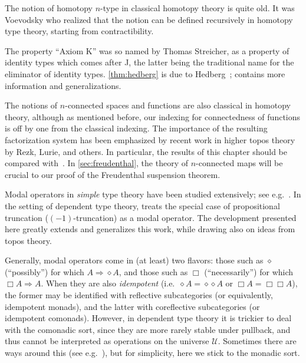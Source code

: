 \documentclass[12pt]{article}
\newcommand{\UU}{\ensuremath{\mathcal{U}}\xspace}
\let\autoref\cref
\begin{document}
The notion of homotopy $n$-type in classical homotopy theory is quite old.
It was Voevodsky who realized that the notion can be defined recursively in homotopy type theory, starting from contractibility.

%
The property ``Axiom K'' was so named by Thomas Streicher, as a property of identity types which comes after J, the latter being the traditional name for the eliminator of identity types.
\autoref{thm:hedberg} is due to Hedberg~\cite{hedberg1998coherence}; \cite{krausgeneralizations} contains more information and generalizations.

The notions of $n$-connected spaces and functions are also classical in homotopy theory, although as mentioned before, our indexing for connectedness of functions is off by one from the classical indexing.
The importance of the resulting factorization system has been emphasized by recent work in higher topos theory by Rezk, Lurie, and others.%
In particular, the results of this chapter should be compared with~\cite[\S6.5.1]{lurie:higher-topoi}.
In \autoref{sec:freudenthal}, the theory of $n$-connected maps will be crucial to our proof of the Freudenthal suspension theorem.

Modal operators in \emph{simple} type theory have been studied extensively; see e.g.~\cite{modalTT}.  In the setting of dependent type theory, \cite{ab:bracket-types} treats the special case of propositional truncation ($(-1)$-truncation) as a modal operator.  The development presented here greatly extends and generalizes this work, while drawing also on ideas from topos theory.

Generally, modal operators come in (at least) two flavors: those such as $\diamond$ (``possibly'') for which $A\Rightarrow \diamond A$, and those such as $\Box$ (``necessarily'') for which $\Box A \Rightarrow A$.
When they are also \emph{idempotent} (i.e.\ $\diamond A = \diamond{\diamond A}$ or $\Box A = \Box{\Box A}$), the former may be identified with reflective subcategories (or equivalently, idempotent monads), and the latter with coreflective subcategories (or idempotent comonads).
However, in dependent type theory it is trickier to deal with the comonadic sort, since they are more rarely stable under pullback, and thus cannot be interpreted as operations on the universe \UU.
Sometimes there are ways around this (see e.g.~\cite{QGFTinCHoTT12}), but for simplicity, here we stick to the monadic sort.
\end{document}
